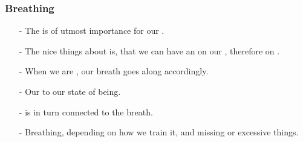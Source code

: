 \begin{frame}
\frametitle{Breathing}

\begin{itemize}
\item[-] The  is of utmost importance for our .
\item[-] The nice things about is, that we can have an  on our , therefore on .
\item[-] When we are , our breath goes along accordingly.
\item[-] Our  to our state of being.
\item[-]  is in turn connected to the breath.
  \item[-] Breathing, depending on how we train it,  and  missing or excessive things.
  \end{itemize}
\end{frame}

